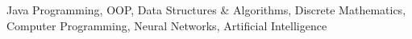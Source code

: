 

\begin{cvskills}

    {Java Programming, OOP,
    Data Structures \& Algorithms, Discrete Mathematics, Computer Programming,\newline
    Neural Networks, Artificial Intelligence}

\end{cvskills}
